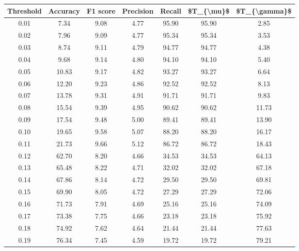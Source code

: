 \begin{tabular}{|c|c|c|c|c|c|c|}
\toprule
 Threshold &  Accuracy &  F1 score &  Precision &  Recall &  \$T\_\{\textbackslash mu\}\$ &  \$T\_\{\textbackslash gamma\}\$ \\
\hline
      0.01 &      7.34 &      9.08 &       4.77 &   95.90 &      95.90 &          2.85 \\
      0.02 &      7.96 &      9.09 &       4.77 &   95.34 &      95.34 &          3.53 \\
      0.03 &      8.74 &      9.11 &       4.79 &   94.77 &      94.77 &          4.38 \\
      0.04 &      9.68 &      9.14 &       4.80 &   94.10 &      94.10 &          5.40 \\
      0.05 &     10.83 &      9.17 &       4.82 &   93.27 &      93.27 &          6.64 \\
      0.06 &     12.20 &      9.23 &       4.86 &   92.52 &      92.52 &          8.13 \\
      0.07 &     13.78 &      9.31 &       4.91 &   91.71 &      91.71 &          9.83 \\
      0.08 &     15.54 &      9.39 &       4.95 &   90.62 &      90.62 &         11.73 \\
      0.09 &     17.54 &      9.48 &       5.00 &   89.41 &      89.41 &         13.90 \\
      0.10 &     19.65 &      9.58 &       5.07 &   88.20 &      88.20 &         16.17 \\
      0.11 &     21.73 &      9.66 &       5.12 &   86.72 &      86.72 &         18.43 \\
      0.12 &     62.70 &      8.20 &       4.66 &   34.53 &      34.53 &         64.13 \\
      0.13 &     65.48 &      8.22 &       4.71 &   32.02 &      32.02 &         67.18 \\
      0.14 &     67.86 &      8.14 &       4.72 &   29.50 &      29.50 &         69.81 \\
      0.15 &     69.90 &      8.05 &       4.72 &   27.29 &      27.29 &         72.06 \\
      0.16 &     71.73 &      7.91 &       4.69 &   25.16 &      25.16 &         74.09 \\
      0.17 &     73.38 &      7.75 &       4.66 &   23.18 &      23.18 &         75.92 \\
      0.18 &     74.92 &      7.62 &       4.64 &   21.44 &      21.44 &         77.63 \\
      0.19 &     76.34 &      7.45 &       4.59 &   19.72 &      19.72 &         79.21 \\

\end{tabular}
